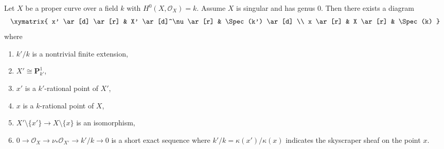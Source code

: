 \begin{lemma}
\label{lemma-genus-zero-singular}
Let $X$ be a proper curve over a field $k$ with $H^0(X, \mathcal{O}_X) = k$.
Assume $X$ is singular and has genus $0$. Then there exists a diagram
$$
\xymatrix{
x' \ar[d] \ar[r] & X' \ar[d]^\nu \ar[r] & \Spec(k') \ar[d] \\
x \ar[r] & X \ar[r] & \Spec(k)
}
$$
where
\begin{enumerate}
\item $k'/k$ is a nontrivial finite extension,
\item $X' \cong \mathbf{P}^1_{k'}$,
\item $x'$ is a $k'$-rational point of $X'$,
\item $x$ is a $k$-rational point of $X$,
\item $X' \setminus \{x'\} \to X \setminus \{x\}$ is an isomorphism,
\item $0 \to \mathcal{O}_X \to \nu_*\mathcal{O}_{X'} \to k'/k \to 0$
is a short exact sequence
where $k'/k = \kappa(x')/\kappa(x)$ indicates the skyscraper sheaf
on the point $x$.
\end{enumerate}
\end{lemma}

